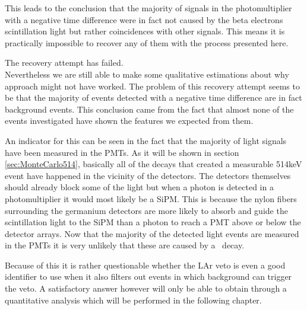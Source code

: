 This leads to the conclusion that the majority of signals in the photomultiplier with a negative time difference were in fact not caused by the beta electrons scintillation light but rather coincidences with other signals.
This means it is practically impossible to recover any of them with the process presented here.

The recovery attempt has failed.
\\

Nevertheless we are still able to make some qualitative estimations about why approach might not have worked. 
The problem of this recovery attempt seems to be that the majority of events detected with a negative time difference are in fact background events.
This conclusion came from the fact that almost none of the events investigated have shown the features we expected from them.

An indicator for this can be seen in the fact that the majority of light signals have been measured in the PMTs.
As it will be shown in section \ref{sec:MonteCarlo514}, basically all of the decays that created a measurable 514keV event have happened in the vicinity of the detectors.
The detectors themselves should already block some of the light but when a photon is detected in a photomultiplier it would most likely be a SiPM.
This is because the nylon fibers surrounding the germanium detectors are more likely to absorb and guide the scintillation light to the SiPM than a photon to reach a PMT above or below the detector arrays.
Now that the majority of the detected light events are measured in the PMTs it is very unlikely that these are caused by a \Kr\ decay.

Because of this it is rather questionable whether the LAr veto is even a good identifier to use when it also filters out events in which background can trigger the veto.
A satisfactory answer however will only be able to obtain through a quantitative analysis which will be performed in the following chapter.
\\
